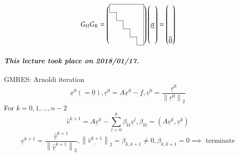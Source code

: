 \documentclass{article}
\newcommand{\norm}[1]{\left\|#1\right\|}
\newcommand{\dateref}[1]{\paragraph{\textit{This lecture took place on #1.}}}
\begin{document}
\[
  G_H G_K = \left(
    \begin{array}{ccccc} \cline{0-4}
        \multicolumn{1}{|c}{} & & & & \multicolumn{1}{c|}{} \\ \cline{1-1}
        \multicolumn{1}{c|}{} & & & & \multicolumn{1}{c|}{} \\ \cline{2-2}
        & \multicolumn{1}{c|}{} & & & \multicolumn{1}{c|}{} \\ \cline{3-3}
        & & \multicolumn{1}{c|}{} & & \multicolumn{1}{c|}{} \\ \cline{4-4}
        & & & \multicolumn{1}{c|}{} & \multicolumn{1}{c|}{} \\ \cline{5-5}
    \end{array}
  \right)
  \begin{pmatrix}
    \\ \\ \underline\alpha \\ \\ \\
  \end{pmatrix}
  =
  \begin{pmatrix}
    \\ \\ \\ \\ \overline 0
  \end{pmatrix}
\]

\dateref{2018/01/17}

GMRES:
Arnoldi iteration
\[ \underline x^0 (= \underline 0), \underline r^0 = A \underline x^0 - \underline f, \underline v^0 = \frac{\underline r^0}{\norm{\underline r^0}_2} \]
For $k=0,1,\ldots,n-2$
\[ \hat v^{k+1} = A \underline v^k - \sum_{l=0}^k \beta_{kl} \underline v^l, \beta_{kl} = (A \underline v^k, \underline v^k) \]
\[ \underline v^{k+1} = \frac{\hat{\underline v}^{k+1}}{\norm{\underline{\hat v}^{k+1}}_2}, \norm{\underline{\hat v^{k+1}}}_2 = \beta_{k,k+1} \neq 0, \beta_{k,k+1} = 0 \implies \text{ terminate} \]
\end{document}
